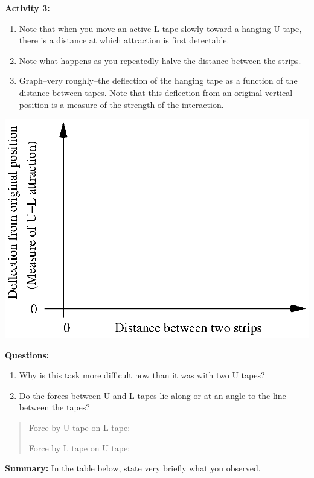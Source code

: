 \textbf{Activity 3:}

\begin{enumerate}
\item Note that when you move an active L tape slowly toward a hanging U
tape, there is a distance at which attraction is first detectable.
\item Note what happens as you repeatedly halve the distance between the
strips.\vspace{15mm}

\item Graph--very roughly--the deflection of the hanging tape as a function
of the distance between tapes. Note that this deflection from an original
vertical position is a measure of the strength of the interaction.
\end{enumerate}
\vspace{0.3cm}
{\centering \includegraphics{interactions_of_electric_charges/int_elec_charges_fig_3.eps} \par}
\vspace{0.3cm}

\textbf{Questions:}

\begin{enumerate}
\item Why is this task more difficult now than it was with two U tapes?\vspace{15mm}

\item Do the forces between U and L tapes lie along or at an angle to the
line between the tapes?
\end{enumerate}
\begin{quotation}
Force by U tape on L tape:
\vspace{10mm}

Force by L tape on U tape:\vspace{10mm}

\end{quotation}
\textbf{Summary:} In the table below, state very briefly what you
observed.

